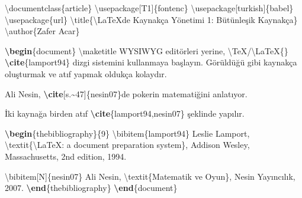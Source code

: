 \documentclass[
  10pt,
]{scrbook}
\newenvironment{Shaded}{\begin{snugshade}}{\end{snugshade}}
\newcommand{\BuiltInTok}[1]{#1}
\newcommand{\ExtensionTok}[1]{#1}
\newcommand{\FunctionTok}[1]{\textcolor[rgb]{0.00,0.00,0.00}{#1}}
\newcommand{\KeywordTok}[1]{\textcolor[rgb]{0.13,0.29,0.53}{\textbf{#1}}}
\newcommand{\NormalTok}[1]{#1}
\theoremstyle{definition}
\theoremstyle{definition}
\theoremstyle{definition}
\theoremstyle{definition}
\theoremstyle{remark}
\begin{document}
\begin{Shaded}
\begin{Highlighting}[]
\BuiltInTok{\textbackslash{}documentclass}\NormalTok{\{}\ExtensionTok{article}\NormalTok{\}}
\BuiltInTok{\textbackslash{}usepackage}\NormalTok{[T1]\{}\ExtensionTok{fontenc}\NormalTok{\}}
\BuiltInTok{\textbackslash{}usepackage}\NormalTok{[turkish]\{}\ExtensionTok{babel}\NormalTok{\}}
\BuiltInTok{\textbackslash{}usepackage}\NormalTok{\{}\ExtensionTok{url}\NormalTok{\}}
\FunctionTok{\textbackslash{}title}\NormalTok{\{}\FunctionTok{\textbackslash{}LaTeX}\NormalTok{\textquotesingle{}de Kaynakça Yönetimi 1: Bütünleşik Kaynakça\}}
\FunctionTok{\textbackslash{}author}\NormalTok{\{Zafer Acar\}}

\KeywordTok{\textbackslash{}begin}\NormalTok{\{}\ExtensionTok{document}\NormalTok{\}}
\FunctionTok{\textbackslash{}maketitle}
\NormalTok{WYSIWYG editörleri yerine, }\FunctionTok{\textbackslash{}TeX}\NormalTok{/}\FunctionTok{\textbackslash{}LaTeX}\NormalTok{\{\}  }\KeywordTok{\textbackslash{}cite}\NormalTok{\{}\ExtensionTok{lamport94}\NormalTok{\}}
\NormalTok{dizgi sistemini kullanmaya başlayın. Görüldüğü gibi kaynakça oluşturmak }
\NormalTok{ve atıf yapmak oldukça kolaydır.}

\NormalTok{Ali Nesin, }\KeywordTok{\textbackslash{}cite}\NormalTok{[s.\textasciitilde{}47]\{}\ExtensionTok{nesin07}\NormalTok{\}\textquotesingle{}de pokerin matematiğini anlatıyor.}

\NormalTok{İki kaynağa birden atıf }\KeywordTok{\textbackslash{}cite}\NormalTok{\{}\ExtensionTok{lamport94,nesin07}\NormalTok{\} şeklinde yapılır.}

\KeywordTok{\textbackslash{}begin}\NormalTok{\{}\ExtensionTok{thebibliography}\NormalTok{\}\{9\}}
\FunctionTok{\textbackslash{}bibitem}\NormalTok{\{lamport94\}}
\NormalTok{Leslie Lamport,}
\FunctionTok{\textbackslash{}textit}\NormalTok{\{}\FunctionTok{\textbackslash{}LaTeX}\NormalTok{: a document preparation system\}, Addison Wesley,}
\NormalTok{Massachusetts, 2nd edition, 1994.}

\FunctionTok{\textbackslash{}bibitem}\NormalTok{[N]\{nesin07\} Ali Nesin, }\FunctionTok{\textbackslash{}textit}\NormalTok{\{Matematik ve Oyun\}, }
\NormalTok{ Nesin Yayıncılık, 2007.}
\KeywordTok{\textbackslash{}end}\NormalTok{\{}\ExtensionTok{thebibliography}\NormalTok{\}}
\KeywordTok{\textbackslash{}end}\NormalTok{\{}\ExtensionTok{document}\NormalTok{\}}
\end{Highlighting}
\end{Shaded}
\end{document}
